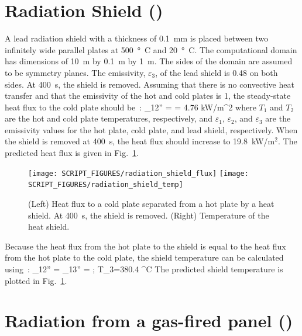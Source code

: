 \documentclass[11pt]{book}
\begin{document}
\section{Radiation Shield (\texorpdfstring{}{radiation\_shield}) }
\label{radiation_shield}

A lead radiation shield with a thickness of 0.1~mm is placed between two infinitely wide parallel plates at 500~\si{\degree C} and 20~\si{\degree C}.  The computational domain has dimensions of 10~m by 0.1~m by 1~m. The sides of the domain are assumed to be symmetry planes.  The emissivity, $\varepsilon_{3}$, of the lead shield is 0.48 on both sides.  At 400~s, the shield is removed.  Assuming that there is no convective heat transfer and that the emissivity of the hot and cold plates is 1, the steady-state heat flux to the cold plate should be~\cite{Incropera:1}:
\be
   \dq_{12}'' =  = 4.76 \; \hbox{kW/m}^2
\ee
where $T_{1}$ and $T_{2}$ are the hot and cold plate temperatures, respectively, and $\varepsilon_1$, $\varepsilon_2$, and $\varepsilon_3$ are the emissivity values for the hot plate, cold plate, and lead shield, respectively. When the shield is removed at 400~s, the heat flux should increase to 19.8~kW/m$^2$.  The predicted heat flux is given in Fig.~\ref{radiation_shield_plot}.
\begin{figure}[ht]
\texttt{[image: SCRIPT\_FIGURES/radiation\_shield\_flux]}
\texttt{[image: SCRIPT\_FIGURES/radiation\_shield\_temp]}
\caption[The  test case]{(Left) Heat flux to a cold plate separated from a hot plate by a heat shield. At 400~s, the shield is removed. (Right) Temperature of the heat shield.}
\label{radiation_shield_plot}
\end{figure}
Because the heat flux from the hot plate to the shield is equal to the heat flux from the hot plate to the cold plate, the shield temperature can be calculated using~\cite{Incropera:1}:
\be
   \dq_{12}'' = \dq_{13}'' =  \quad ; \quad T_3=380.4 \; ^\circ\hbox{C}
\ee
The predicted shield temperature is plotted in Fig.~\ref{radiation_shield_plot}.


\section{Radiation from a gas-fired panel (\texorpdfstring{}{radiation\_gas\_panel}) }
\label{radiation_gas_panel}
\end{document}
